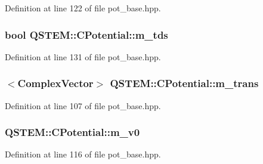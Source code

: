 Definition at line 122 of file pot\-\_\-base.\-hpp.

\hypertarget{class_q_s_t_e_m_1_1_c_potential_ae5703ab321d389895876aced33f898ce}{
\subsubsection[{m\-\_\-tds}]{\setlength{\rightskip}{0pt plus 5cm}bool Q\-S\-T\-E\-M\-::\-C\-Potential\-::m\-\_\-tds\hspace{0.3cm}{\ttfamily [protected]}}}\label{class_q_s_t_e_m_1_1_c_potential_ae5703ab321d389895876aced33f898ce}


Definition at line 131 of file pot\-\_\-base.\-hpp.

\hypertarget{class_q_s_t_e_m_1_1_c_potential_adb76672fc393aeac0f027e44b48715f8}{
\subsubsection[{m\-\_\-trans}]{$<${\bf Complex\-Vector}$>$ Q\-S\-T\-E\-M\-::\-C\-Potential\-::m\-\_\-trans\hspace{0.3cm}{\ttfamily [protected]}}}\label{class_q_s_t_e_m_1_1_c_potential_adb76672fc393aeac0f027e44b48715f8}


Definition at line 107 of file pot\-\_\-base.\-hpp.

\hypertarget{class_q_s_t_e_m_1_1_c_potential_a9f9f3123596298af6e24256ead39085c}{
\subsubsection[{m\-\_\-v0}]{ Q\-S\-T\-E\-M\-::\-C\-Potential\-::m\-\_\-v0\hspace{0.3cm}{\ttfamily [protected]}}}\label{class_q_s_t_e_m_1_1_c_potential_a9f9f3123596298af6e24256ead39085c}


Definition at line 116 of file pot\-\_\-base.\-hpp.

